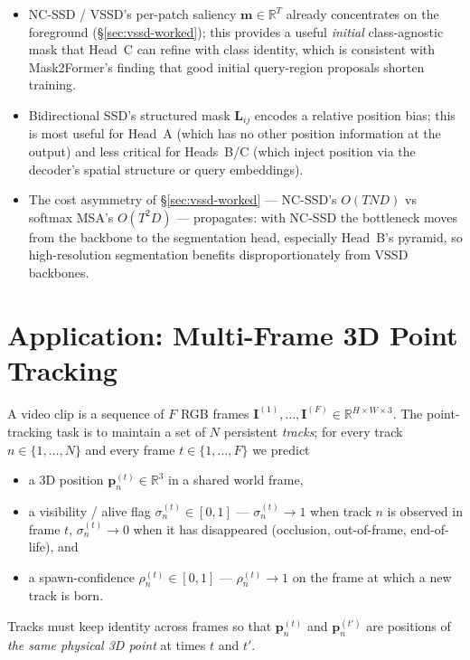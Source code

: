 \documentclass[11pt,a4paper]{article}
\begin{document}
\begin{itemize}
  \item NC-SSD / VSSD's per-patch saliency
        $\bm{m}\in\mathbb{R}^{T}$ already concentrates on the
        foreground (\S\ref{sec:vssd-worked}); this provides a useful
        \emph{initial} class-agnostic mask that Head~C can refine
        with class identity, which is consistent with Mask2Former's
        finding that good initial query-region proposals shorten
        training.
  \item Bidirectional SSD's structured mask $\bm{L}_{ij}$ encodes a
        relative position bias; this is most useful for Head~A
        (which has no other position information at the output) and
        less critical for Heads~B/C (which inject position via the
        decoder's spatial structure or query embeddings).
  \item The cost asymmetry of \S\ref{sec:vssd-worked} — NC-SSD's
        $O(TND)$ vs softmax MSA's $O(T^2D)$ — propagates: with NC-SSD
        the bottleneck moves from the backbone to the segmentation
        head, especially Head~B's pyramid, so high-resolution
        segmentation benefits disproportionately from VSSD backbones.
\end{itemize}

\section{Application: Multi-Frame 3D Point Tracking}
\label{sec:tracking}

A video clip is a sequence of $F$ RGB frames
$\bm{I}^{(1)},\dots,\bm{I}^{(F)}\in\mathbb{R}^{H\times W\times 3}$.
The point-tracking task is to maintain a set of $N$ persistent
\emph{tracks}; for every track $n\in\{1,\dots,N\}$ and every frame
$t\in\{1,\dots,F\}$ we predict
\begin{itemize}
  \item a 3D position $\bm{p}_n^{(t)} \in \mathbb{R}^{3}$ in a
        shared world frame,
  \item a visibility / alive flag $\sigma_n^{(t)} \in [0, 1]$ —
        $\sigma_n^{(t)} \!\to\! 1$ when track $n$ is observed in
        frame $t$, $\sigma_n^{(t)} \!\to\! 0$ when it has disappeared
        (occlusion, out-of-frame, end-of-life), and
  \item a spawn-confidence $\rho_n^{(t)} \in [0, 1]$ — $\rho_n^{(t)}
        \!\to\! 1$ on the frame at which a new track is born.
\end{itemize}
Tracks must keep identity across frames so that
$\bm{p}_n^{(t)}$ and $\bm{p}_n^{(t')}$ are positions of \emph{the same
physical 3D point} at times $t$ and $t'$.
\end{document}
